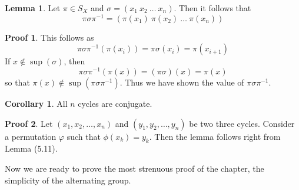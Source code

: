 \documentclass[12pt]{amsbook}
\theoremstyle{definition}
\newtheorem{lemma}[theorem]{Lemma}
\newtheorem{corollary}[theorem]{Corollary}
\newtheorem*{prf}{Proof}
\begin{document}
\begin{lemma}
    Let $\pi \in S_X$ and $\sigma = (x_1\ x_2\ \dots\ x_n)$. Then it follows that
    \[\pi \sigma \pi^{-1} = (\pi(x_1)\ \pi(x_2)\ \dots\ \pi(x_n))\]
\end{lemma}
\begin{prf}
    This follows as
    \[ \pi \sigma \pi^{-1} (\pi(x_i)) = \pi \sigma(x_i) = \pi(x_{i+1}) \]
    If $x \notin \sup(\sigma)$, then
    \[ \pi \sigma \pi^{-1} (\pi (x)) = (\pi \sigma) (x) = \pi(x) \]
    so that $\pi(x) \notin \sup(\pi \sigma \pi^{-1})$. Thus we have shown the value of $\pi \sigma \pi^{-1}$.
\end{prf}

\begin{corollary}
    All $n$ cycles are conjugate.
\end{corollary}
\begin{prf}
    Let $(x_1, x_2, \dots, x_n)$ and $(y_1, y_2, \dots, y_n)$ be two three cycles. Consider a permutation $\varphi$ such that $\phi(x_k) = y_k$. Then the lemma follows right from Lemma (5.11).
\end{prf}

Now we are ready to prove the most strenuous proof of the chapter, the simplicity of the alternating group.
\end{document}

